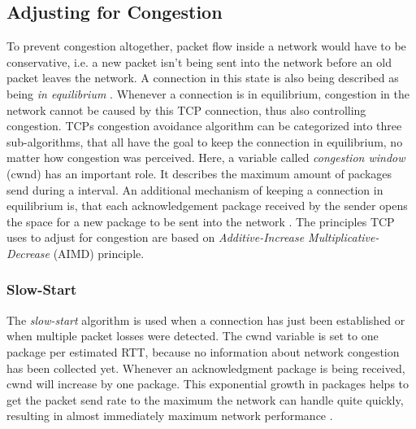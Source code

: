 \documentclass[a4paper,conference]{IEEEtran}
\begin{document}
\subsection{Adjusting for Congestion}
\label{AfC}
To prevent congestion altogether, packet flow inside a network would have to be conservative, i.e. a new packet isn't being sent into the network before an old packet leaves the network. A connection in this state is also being described as being \textit{in equilibrium} \cite{jacobson1992tcp}. Whenever a connection is in equilibrium, congestion in the network cannot be caused by this TCP connection, thus also controlling congestion. TCPs congestion avoidance algorithm can be categorized into three sub-algorithms, that all have the goal to keep the connection in equilibrium, no matter how congestion was perceived. Here, a variable called \textit{congestion window} (cwnd) has an important role. It describes the maximum amount of packages send during a interval. An additional mechanism of keeping a connection in equilibrium is, that each acknowledgement package received by the sender opens the space for a new package to be sent into the network \cite{jacobson1992tcp}. The principles TCP uses to adjust for congestion are based on \textit{Additive-Increase Multiplicative-Decrease} (AIMD) principle.

\subsubsection*{Slow-Start}
The \textit{slow-start} algorithm is used when a connection has just been established or when multiple packet losses were detected. The cwnd variable is set to one package per estimated RTT, because no information about network congestion has been collected yet. Whenever an acknowledgment package is being received, cwnd will increase by one package. This exponential growth in packages helps to get the packet send rate to the maximum the network can handle quite quickly, resulting in almost immediately maximum network performance \cite{jacobson1992tcp}.
\end{document}
